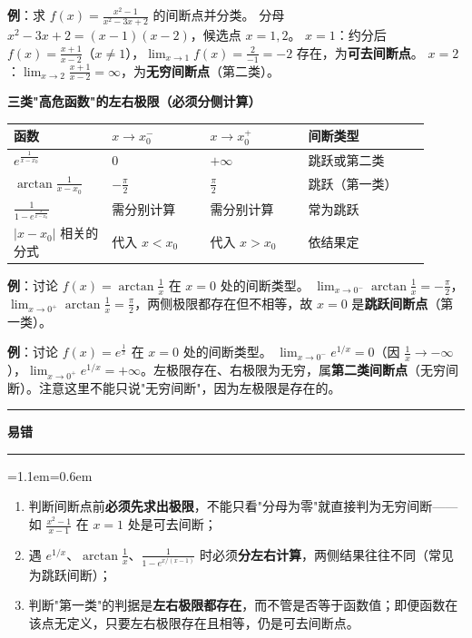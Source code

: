 \documentclass[11pt,openany,UTF8]{ctexbook}
\newcommand{\callouthead}[2]{%
  \par\addvspace{7pt}\noindent
  {\color{#1}\rule[-0.15em]{3pt}{1.05em}}\hspace{0.5em}%
  {\bfseries\color{#1}#2}\par\nobreak\vspace{-0.35em}%
  {\color{rulesep}\hrule height 0.4pt}\nobreak\vspace{0.45em}%
  \begingroup\small\setlength{\parindent}{0pt}%
  \leftskip=1.1em\rightskip=0.6em\noindent\ignorespaces}
\newcommand{\calloutend}{\par\endgroup\addvspace{7pt}}
\newenvironment{callwarn}[1]{\callouthead{warnbar}{#1}}{\calloutend}
\begin{document}
\textbf{例}：求 $f(x)=\frac{x^{2}-1}{x^{2}-3x+2}$ 的间断点并分类。 分母 $x^{2}-3x+2=(x-1)(x-2)$，候选点 $x=1,2$。 $x=1$：约分后 $f(x)=\frac{x+1}{x-2}$（$x\ne 1$），$\lim_{x\to 1}f(x)=\frac{2}{-1}=-2$ 存在，为\textbf{可去间断点}。 $x=2$：$\lim_{x\to 2}\frac{x+1}{x-2}=\infty$，为\textbf{无穷间断点}（第二类）。

\textbf{三类"高危函数"的左右极限（必须分侧计算）}

\begingroup\small\setlength{\tabcolsep}{4.0pt}
\begin{longtable}{@{}L{0.2144\linewidth}L{0.2144\linewidth}L{0.2144\linewidth}L{0.2680\linewidth}@{}}
\toprule
\textbf{函数} & \textbf{$x\to x_0^-$} & \textbf{$x\to x_0^+$} & \textbf{间断类型} \\
\midrule
\endhead
$e^{\frac{1}{x-x_0}}$ & $0$ & $+\infty$ & 跳跃或第二类 \\
$\arctan\frac{1}{x-x_0}$ & $-\frac{\pi}{2}$ & $\frac{\pi}{2}$ & 跳跃（第一类） \\
$\frac{1}{1-e^{\frac{x}{x-x_0}}}$ & 需分别计算 & 需分别计算 & 常为跳跃 \\
$\vert x-x_0\vert$ 相关的分式 & 代入 $x<x_0$ & 代入 $x>x_0$ & 依结果定 \\
\bottomrule
\end{longtable}
\endgroup

\textbf{例}：讨论 $f(x)=\arctan\frac1x$ 在 $x=0$ 处的间断类型。 $\lim_{x\to 0^-}\arctan\frac1x=-\frac{\pi}{2}$，$\lim_{x\to 0^+}\arctan\frac1x=\frac{\pi}{2}$，两侧极限都存在但不相等，故 $x=0$ 是\textbf{跳跃间断点}（第一类）。

\textbf{例}：讨论 $f(x)=e^{\frac1x}$ 在 $x=0$ 处的间断类型。 $\lim_{x\to 0^-}e^{1/x}=0$（因 $\frac1x\to-\infty$），$\lim_{x\to 0^+}e^{1/x}=+\infty$。左极限存在、右极限为无穷，属\textbf{第二类间断点}（无穷间断）。注意这里不能只说"无穷间断"，因为左极限是存在的。

\begin{callwarn}{易错}
\begin{enumerate}
\item 判断间断点前\textbf{必须先求出极限}，不能只看"分母为零"就直接判为无穷间断——如 $\frac{x^2-1}{x-1}$ 在 $x=1$ 处是可去间断；
\item 遇 $e^{1/x}$、$\arctan\frac1x$、$\frac{1}{1-e^{x/(x-1)}}$ 时必须\textbf{分左右计算}，两侧结果往往不同（常见为跳跃间断）；
\item 判断"第一类"的判据是\textbf{左右极限都存在}，而不管是否等于函数值；即便函数在该点无定义，只要左右极限存在且相等，仍是可去间断点。
\end{enumerate}
\end{callwarn}
\end{document}

